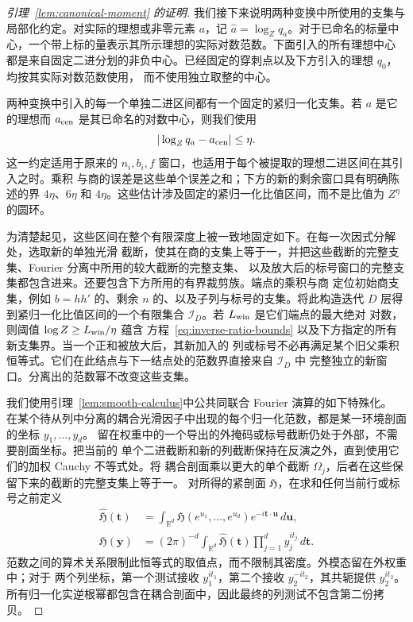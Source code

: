 \documentclass[11pt,a4paper]{article}
\numberwithin{equation}{section}
\numberwithin{figure}{section}
\theoremstyle{definition}
\theoremstyle{remark}
\begin{document}
\begin{proof}[引理~\ref{lem:canonical-moment} 的证明]
我们接下来说明两种变换中所使用的支集与局部化约定。对实际的理想或非零元素 \(a\)，记
\(\widehat a=\log_Zq_a\)。对于已命名的标量中心，一个带上标的量表示其所示理想的实际对数范数。下面引入的所有理想中心
都是来自固定二进分划的非负中心。已经固定的穿刺点以及下方引入的理想 \(q_0\)，均按其实际对数范数使用，
而不使用独立取整的中心。

两种变换中引入的每一个单独二进区间都有一个固定的紧归一化支集。若 \(a\) 是它的理想而 \(a_{\rm cen}\)
是其已命名的对数中心，则我们使用
\begin{equation}\label{eq:inverse-ratio-bounds}
 |\log_Zq_a-a_{\rm cen}|\le\eta.
\end{equation}
这一约定适用于原来的 \(n_i,b_i,f\) 窗口，也适用于每个被提取的理想二进区间在其引入之时。乘积
与商的误差是这些单个误差之和；下方的新的剩余窗口具有明确陈述的界 \(4\eta\)、\(6\eta\)
和 \(4\eta\)。这些估计涉及固定的紧归一化比值区间，而不是比值为 \(Z^\eta\) 的圆环。

为清楚起见，这些区间在整个有限深度上被一致地固定如下。在每一次因式分解处，选取新的单独光滑
截断，使其在商的支集上等于一，并把这些截断的完整支集、Fourier 分离中所用的较大截断的完整支集、
以及放大后的标号窗口的完整支集都包含进来。还要包含下方所用的有界裁剪族。端点的乘积与商
定位初始商支集，例如 \(b=hh'\) 的、剩余 \(n\) 的、以及子列与标号的支集。将此构造迭代
\(D\) 层得到紧归一化比值区间的一个有限集合 \(\mathcal I_D\)。若 \(L_{\rm win}\) 是它们端点的最大绝对
对数，则阈值
\(\log Z\ge L_{\rm win}/\eta\) 蕴含
方程~\eqref{eq:inverse-ratio-bounds} 以及下方指定的所有新支集界。当一个正和被放大后，其新加入的
列或标号不必再满足某个旧父乘积恒等式。它们在此结点与下一结点处的范数界直接来自 \(\mathcal I_D\) 中
完整独立的新窗口。分离出的范数幂不改变这些支集。

我们使用引理~\ref{lem:smooth-calculus}中公共同联合 Fourier 演算的如下特殊化。
在某个待从列中分离的耦合光滑因子中出现的每个归一化范数，都是某一环境剖面的坐标 \(y_1,\ldots,y_d\)。
留在权重中的一个导出的外掩码或标号截断仍处于外部，不需要剖面坐标。把当前的
单个二进截断和新的列截断保持在反演之外，直到使用它们的加权 Cauchy 不等式处。将
耦合剖面乘以更大的单个截断 \(\Omega_j\)，后者在这些保留下来的截断的完整支集上等于一。
对所得的紧剖面 \(\mathfrak H\)，在求和任何当前行或标号之前定义
\begin{equation}\label{eq:inverse-log-fourier}
 \begin{split}
 \widehat{\mathfrak H}(\boldsymbol t)
   &=\int_{\mathbb R^d}\mathfrak H(e^{u_1},\ldots,e^{u_d})
             e^{-i\boldsymbol t\cdot\boldsymbol u}\,d\boldsymbol u,\\
 \mathfrak H(\boldsymbol y)
   &=(2\pi)^{-d}\int_{\mathbb R^d}\widehat{\mathfrak H}(\boldsymbol t)
          \prod_{j=1}^dy_j^{it_j}\,d\boldsymbol t.
 \end{split}
\end{equation}
范数之间的算术关系限制此恒等式的取值点，而不限制其密度。外模态留在外权重中；对于
两个列坐标，第一个测试接收 \(y_1^{it_1}\)，第二个接收 \(y_2^{-it_2}\)，其共轭提供
\(y_2^{it_2}\)。所有归一化实逆根幂都包含在耦合剖面中，因此最终的列测试不包含第二份拷贝。


\end{proof}
\end{document}
